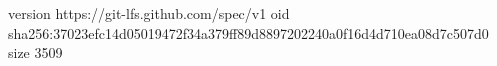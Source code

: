 version https://git-lfs.github.com/spec/v1
oid sha256:37023efc14d05019472f34a379ff89d8897202240a0f16d4d710ea08d7c507d0
size 3509
